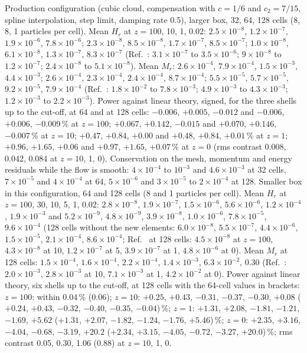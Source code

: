 \documentclass[aps,prd,twocolumn,10pt,superscriptaddress,nofootinbib,longbibliography,floatfix]{revtex4-2}
\begin{document}
Production configuration (cubic cloud, compensation with $c = 1/6$ and $c_2 = 7/15$, spline interpolation, step limit, damping rate 0.5), larger box, 32, 64, 128 cells (8, 8, 1 particles per cell). Mean $H_r$ at $z = 100$, 10, 1, 0.02: $2.5\times10^{-8}$, $1.2\times10^{-7}$, $1.9\times10^{-6}$, $7.8\times10^{-6}$; $2.3\times10^{-8}$, $8.5\times10^{-8}$, $1.7\times10^{-7}$, $8.5\times10^{-7}$; $1.0\times10^{-8}$, $6.1\times10^{-8}$, $1.3\times10^{-7}$, $8.3\times10^{-7}$ (Ref.~\cite{Daverio:2019gql}: $3.1\times10^{-7}$ to $3.5\times10^{-6}$; $9\times10^{-8}$ to $1.2\times10^{-7}$; $2.4\times10^{-8}$ to $5.1\times10^{-8}$). Mean $M_r$: $2.6\times10^{-4}$, $7.9\times10^{-4}$, $1.5\times10^{-3}$, $4.4\times10^{-3}$; $2.6\times10^{-4}$, $2.3\times10^{-4}$, $2.4\times10^{-4}$, $8.7\times10^{-4}$; $5.5\times10^{-5}$, $5.7\times10^{-5}$, $9.2\times10^{-5}$, $7.9\times10^{-4}$ (Ref.~\cite{Daverio:2019gql}: $1.8\times10^{-2}$ to $7.8\times10^{-3}$; $4.9\times10^{-3}$ to $4.3\times10^{-3}$; $1.2\times10^{-3}$ to $2.2\times10^{-3}$). Power against linear theory, signed, for the three shells up to the cut-off, at 64 and at 128 cells: $-0.006$, $+0.005$, $-0.012$ and $-0.006$, $+0.006$, $-0.009\,\%$ at $z = 100$; $+0.067$, $+0.142$, $-0.015$ and $+0.070$, $+0.146$, $-0.007\,\%$ at $z = 10$; $+0.47$, $+0.84$, $+0.00$ and $+0.48$, $+0.84$, $+0.01\,\%$ at $z = 1$; $+0.96$, $+1.65$, $+0.06$ and $+0.97$, $+1.65$, $+0.07\,\%$ at $z = 0$ (rms contrast 0.008, 0.042, 0.084 at $z = 10$, 1, 0). Conservation on the mesh, momentum and energy residuals while the flow is smooth: $4\times10^{-4}$ to $10^{-3}$ and $4.6\times10^{-3}$ at 32 cells, $7\times10^{-5}$ and $4\times10^{-4}$ at 64, $5\times10^{-6}$ and $3\times10^{-5}$ to $2\times10^{-4}$ at 128. Smaller box in this configuration, 64 and 128 cells (8 and 1 particles per cell). Mean $H_r$ at $z = 100$, 30, 10, 5, 1, 0.02: $2.8\times10^{-8}$, $1.9\times10^{-7}$, $1.5\times10^{-6}$, $5.6\times10^{-6}$, $1.2\times10^{-4}$, $1.9\times10^{-3}$ and $5.2\times10^{-9}$, $4.8\times10^{-9}$, $3.9\times10^{-8}$, $1.0\times10^{-6}$, $7.8\times10^{-5}$, $9.6\times10^{-4}$ (128 cells without the new elements: $6.0\times10^{-8}$, $5.5\times10^{-7}$, $4.4\times10^{-6}$, $1.5\times10^{-5}$, $2.1\times10^{-4}$, $8.6\times10^{-4}$; Ref.~\cite{Daverio:2019gql} at 128 cells: $4.5\times10^{-8}$ at $z = 100$, $4.3\times10^{-8}$ at 10, $1.2\times10^{-7}$ at 5, $3.9\times10^{-7}$ at 1, $4.8\times10^{-6}$ at 0). Mean $M_r$ at 128 cells: $1.5\times10^{-4}$, $1.6\times10^{-4}$, $2.2\times10^{-4}$, $1.4\times10^{-3}$, $6.3\times10^{-2}$, 0.30 (Ref.~\cite{Daverio:2019gql}: $2.0\times10^{-3}$, $2.8\times10^{-3}$ at 10, $7.1\times10^{-3}$ at 1, $4.2\times10^{-2}$ at 0). Power against linear theory, six shells up to the cut-off, at 128 cells with the 64-cell values in brackets: $z = 100$: within 0.04\,\% (0.06); $z = 10$: $+0.25$, $+0.43$, $-0.31$, $-0.37$, $-0.30$, $+0.08$ ($+0.24$, $+0.43$, $-0.32$, $-0.40$, $-0.35$, $-0.04$)\,\%; $z = 1$: $+1.31$, $+2.08$, $-1.81$, $-1.21$, $-1.69$, $+5.62$ ($+1.31$, $+2.07$, $-1.82$, $-1.24$, $-1.76$, $+5.46$)\,\%; $z = 0$: $+2.35$, $+3.16$, $-4.04$, $-0.68$, $-3.19$, $+20.2$ ($+2.34$, $+3.15$, $-4.05$, $-0.72$, $-3.27$, $+20.0$)\,\%; rms contrast 0.05, 0.30, 1.06 (0.88) at $z = 10$, 1, 0.
\end{document}
